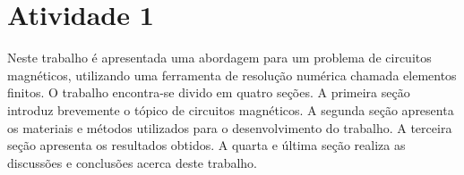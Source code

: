 \chapter{Atividade 1}
Neste trabalho é apresentada uma abordagem para um problema de circuitos magnéticos, utilizando uma ferramenta de resolução numérica chamada elementos finitos. O trabalho encontra-se divido em quatro seções. A primeira seção introduz brevemente o tópico de circuitos magnéticos. A segunda seção apresenta os materiais e métodos utilizados para o desenvolvimento do trabalho. A terceira seção apresenta os resultados obtidos. A quarta e última seção realiza as discussões e conclusões acerca deste trabalho.
\newpage
\pagebreak

\newpage
\pagebreak

\newpage
\pagebreak

\newpage
\pagebreak

